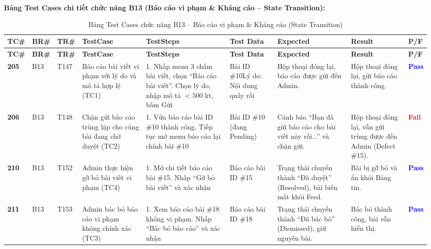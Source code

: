 \documentclass[11pt,a4paper]{article}
\begin{document}
\pagebreak
\noindent\textbf{Bảng Test Cases chi tiết chức năng B13 (Báo cáo vi phạm \& Kháng cáo -- State Transition):}
\begingroup
\scriptsize
\setlength{\tabcolsep}{3pt}
\begin{longtable}{|C{0.8cm}|C{0.75cm}|C{0.95cm}|L{2.0cm}|L{3.0cm}|L{2.25cm}|L{2.6cm}|L{2.5cm}|C{0.85cm}|}
\hline
{}
\textbf{TC\#} & \textbf{BR\#} & \textbf{TR\#} & \textbf{TestCase} & \textbf{TestSteps} & \textbf{Test Data} & \textbf{Expected} & \textbf{Result} & \textbf{P/F} \tabularnewline
\hline
\endfirsthead
\hline
{}
\textbf{TC\#} & \textbf{BR\#} & \textbf{TR\#} & \textbf{TestCase} & \textbf{TestSteps} & \textbf{Test Data} & \textbf{Expected} & \textbf{Result} & \textbf{P/F} \tabularnewline
\hline
\endhead
\hline
\endfoot
\hline
\caption{Bảng Test Cases chức năng B13 -- Báo cáo vi phạm \& Kháng cáo (State Transition)}
\endlastfoot
\textbf{205} & B13 & T147 & Báo cáo bài viết vi phạm với lý do và mô tả hợp lệ (TC1) & 1. Nhấp menu 3 chấm bài viết, chọn ``Báo cáo bài viết''. Chọn lý do, nhập mô tả $< 500$ kt, bấm Gửi & Bài ID \#10\newline Lý do: Nội dung quấy rối & Hộp thoại đóng lại, báo cáo được gửi đến Admin. & Hộp thoại đóng lại, gửi báo cáo thành công. & \textcolor{blue}{\textbf{Pass}} \\ \hline
\textbf{206} & B13 & T148 & Chặn gửi báo cáo trùng lặp cho cùng bài đang chờ duyệt (TC2) & 1. Vừa báo cáo bài ID \#10 thành công. Tiếp tục mở menu báo cáo lại chính bài \#10 & Bài ID \#10 (đang Pending) & Cảnh báo ``Bạn đã gửi báo cáo cho bài viết này rồi...'' và chặn gửi. & Hộp thoại đóng lại, vẫn gửi trùng được đến Admin (Defect \#15). & \textcolor{red}{\textbf{Fail}} \\ \hline
\textbf{210} & B13 & T152 & Admin thực hiện gỡ bỏ bài viết vi phạm (TC4) & 1. Mở chi tiết báo cáo bài \#15. Nhấp ``Gỡ bỏ bài viết'' và xác nhận & Báo cáo bài ID \#15 & Trạng thái chuyển thành ``Đã duyệt'' (Resolved), bài biến mất khỏi Feed. & Bài bị gỡ bỏ và ẩn khỏi Bảng tin. & \textcolor{blue}{\textbf{Pass}} \\ \hline
\textbf{211} & B13 & T153 & Admin bác bỏ báo cáo vi phạm không chính xác (TC3) & 1. Xem báo cáo bài \#18 không vi phạm. Nhấp ``Bác bỏ báo cáo'' và xác nhận & Báo cáo bài ID \#18 & Trạng thái chuyển thành ``Đã bác bỏ'' (Dismissed), giữ nguyên bài. & Bác bỏ thành công, bài vẫn hiển thị. & \textcolor{blue}{\textbf{Pass}} \\ \hline

\end{longtable}
\end{document}
